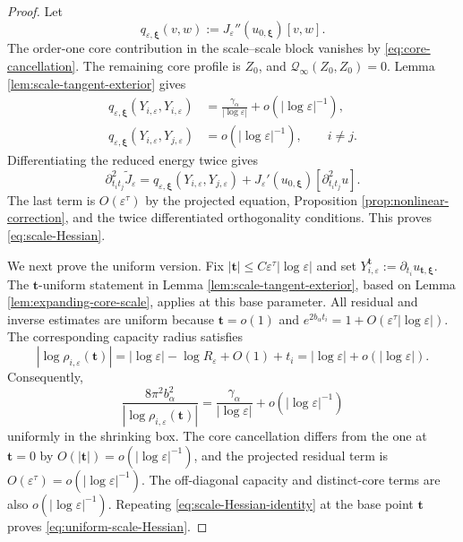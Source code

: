 \documentclass[11pt]{article}
\numberwithin{equation}{section}
\begin{document}
\begin{proof}
Let
\[
q_{\varepsilon,\boldsymbol\xi}(v,w)
:=J_\varepsilon''(u_{0,\boldsymbol\xi})[v,w].
\]
The order-one core contribution in the scale--scale block vanishes by
\eqref{eq:core-cancellation}. The remaining core profile is $Z_0$,
and $\mathcal Q_\infty(Z_0,Z_0)=0$. Lemma
\ref{lem:scale-tangent-exterior} gives
\begin{align*}
q_{\varepsilon,\boldsymbol\xi}
(Y_{i,\varepsilon},Y_{i,\varepsilon})
&=\frac{\gamma_\alpha}{|\log\varepsilon|}
+o(|\log\varepsilon|^{-1}),
\\
q_{\varepsilon,\boldsymbol\xi}
(Y_{i,\varepsilon},Y_{j,\varepsilon})
&=o(|\log\varepsilon|^{-1}),
\qquad i\ne j.
\end{align*}
Differentiating the reduced energy twice gives
\begin{equation}\label{eq:scale-Hessian-identity}
\partial_{t_it_j}^2\widetilde J_\varepsilon
=q_{\varepsilon,\boldsymbol\xi}
(Y_{i,\varepsilon},Y_{j,\varepsilon})
+J_\varepsilon'(u_{0,\boldsymbol\xi})
[\partial_{t_it_j}^2u].
\end{equation}
The last term is $O(\varepsilon^\tau)$ by the projected equation,
Proposition \ref{prop:nonlinear-correction}, and the twice
differentiated orthogonality conditions. This proves
\eqref{eq:scale-Hessian}.

We next prove the uniform version. Fix
$|\boldsymbol t|\leq
C\varepsilon^\tau|\log\varepsilon|$ and set
$Y_{i,\varepsilon}^{\boldsymbol t}
:=\partial_{t_i}u_{\boldsymbol t,\boldsymbol\xi}$. The $\boldsymbol t$-uniform statement in Lemma
\ref{lem:scale-tangent-exterior}, based on Lemma
\ref{lem:expanding-core-scale}, applies at this base parameter. All
residual and inverse estimates are uniform because
$\boldsymbol t=o(1)$ and
$e^{2b_\alpha t_i}=1+O(\varepsilon^\tau|\log\varepsilon|)$. The
corresponding capacity radius satisfies
\[
|\log\rho_{i,\varepsilon}(\boldsymbol t)|
=|\log\varepsilon|-\log R_\varepsilon+O(1)+t_i
=|\log\varepsilon|+o(|\log\varepsilon|).
\]
Consequently,
\[
\frac{8\pi^2b_\alpha^2}
{|\log\rho_{i,\varepsilon}(\boldsymbol t)|}
=\frac{\gamma_\alpha}{|\log\varepsilon|}
+o(|\log\varepsilon|^{-1})
\]
uniformly in the shrinking box. The core cancellation differs from
the one at $\boldsymbol t=0$ by
$O(|\boldsymbol t|)=o(|\log\varepsilon|^{-1})$, and the projected
residual term is $O(\varepsilon^\tau)=o(|\log\varepsilon|^{-1})$.
The off-diagonal capacity and distinct-core terms are also
$o(|\log\varepsilon|^{-1})$. Repeating
\eqref{eq:scale-Hessian-identity} at the base point
$\boldsymbol t$ proves \eqref{eq:uniform-scale-Hessian}.


\end{proof}
\end{document}
